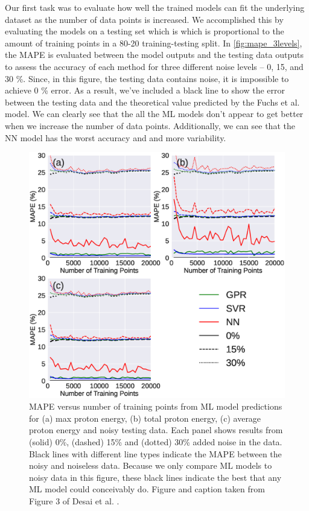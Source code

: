Our first task was to evaluate how well the trained models can fit the underlying dataset as the number of data points is increased. We accomplished this by evaluating the models on a testing set which is which is proportional to the amount of training points in a 80-20 training-testing split. In \autoref{fig:mape_3levels}, the \gls{MAPE} is evaluated between the model outputs and the testing data outputs to assess the accuracy of each method for three different noise levels -- 0, 15, and 30 \%. Since, in this figure, the testing data contains noise, it is impossible to achieve 0 \% error. As a result, we've included a black line to show the error between the testing data and the theoretical value predicted by the Fuchs et al. model. We can clearly see that the all the \gls{ML} models don't appear to get better when we increase the number of data points.  Additionally, we can see that the \gls{NN} model has the worst accuracy and and more variability.

\begin{figure}
	\centering 
	\includegraphics[width=0.75\linewidth]{planning/images/paper1/test_mape_3levels.eps}
	\caption{MAPE versus number of training points from ML model predictions for (a) max proton energy, (b) total proton energy, (c) average proton energy and noisy testing data. Each panel shows results from (solid) 0\%, (dashed) 15\% and (dotted) 30\% added noise in the data. Black lines with different line types indicate the MAPE between the noisy and noiseless data. Because we only compare ML models to noisy data in this figure, these black lines indicate the best that any ML model could conceivably do. Figure and caption taken from Figure 3 of Desai et al. \cite{Desai_2024_CPP}.}
	\label{fig:mape_3levels}
\end{figure}

